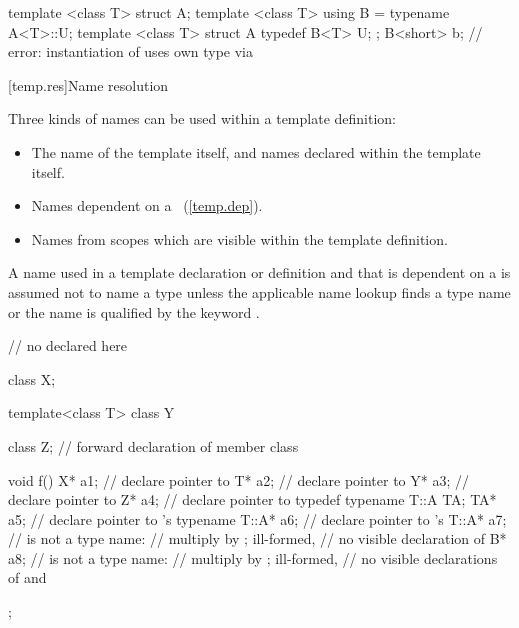\begin{codeblock}
template <class T> struct A;
template <class T> using B = typename A<T>::U;
template <class T> struct A {
  typedef B<T> U;
};
B<short> b;         // error: instantiation of  uses own type via 
\end{codeblock}
\exitexample

[temp.res]{Name resolution}

\pnum
{}%
%
Three kinds of names can be used within a template definition:

\begin{itemize}
\item
The name of the template itself,
and names declared within the template itself.
\item
Names dependent on a
~(\ref{temp.dep}).
\item
Names from scopes which are visible within the template definition.
\end{itemize}

\pnum
A name used in a template declaration or definition and that is
dependent on a
is assumed not to name a type unless
the applicable name lookup finds a type name or the name
is qualified by the keyword
.
\enterexample

\begin{codeblock}
// no  declared here

class X;

template<class T> class Y {
  class Z;                      // forward declaration of member class

  void f() {
    X* a1;                      // declare pointer to 
    T* a2;                      // declare pointer to 
    Y* a3;                      // declare pointer to 
    Z* a4;                      // declare pointer to 
    typedef typename T::A TA;
    TA* a5;                     // declare pointer to 's 
    typename T::A* a6;          // declare pointer to 's 
    T::A* a7;                   //  is not a type name:
                                // multiply  by ; ill-formed,
                                // no visible declaration of 
    B* a8;                      //  is not a type name:
                                // multiply  by ; ill-formed,
                                // no visible declarations of  and 
  }
};
\end{codeblock}
\exitexample

